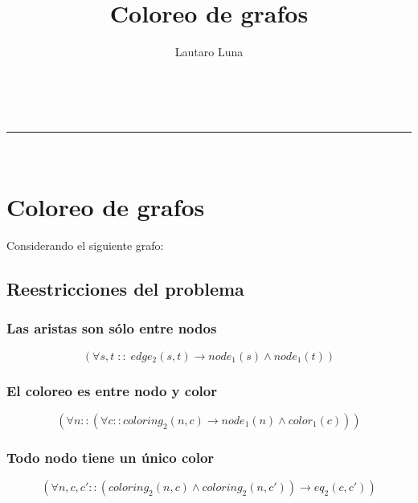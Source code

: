 \documentclass[a4paper,11pt]{article}
\makeatletter
\newcommand{\linia}{\rule{\linewidth}{0.5pt}}
\renewcommand{\maketitle}{
\begin{center}
\vspace{2ex}
{\Large \textsc{\@title}}
\vspace{1ex}
\\
\linia\\
\@author \hfill \@date
\vspace{4ex}
\end{center}
}
\makeatother
\begin{document}
\title{Coloreo de grafos}

\author{Lautaro Luna}

\date{}

\maketitle

\vspace*{-1cm}

\tableofcontents  %
\newpage

\section{Coloreo de grafos}
Considerando el siguiente grafo:


\subsection{Reestricciones del problema}

\subsubsection{Las aristas son sólo entre nodos}
\begin{equation}
    (\forall s, t\;::\; edge_2(s, t) \rightarrow node_1(s) \land node_1(t))
\end{equation}

\subsubsection{El coloreo es entre nodo y color}
\begin{equation}
    (\forall n :: (\forall c :: coloring_2(n, c) \rightarrow node_1(n) \land color_1(c) ) )
\end{equation}

\subsubsection{Todo nodo tiene un único color}
\begin{equation}
    (\forall n, c, c' :: (coloring_2(n, c) \land coloring_2(n, c')) \rightarrow eq_2(c, c'))
\end{equation}
\end{document}
